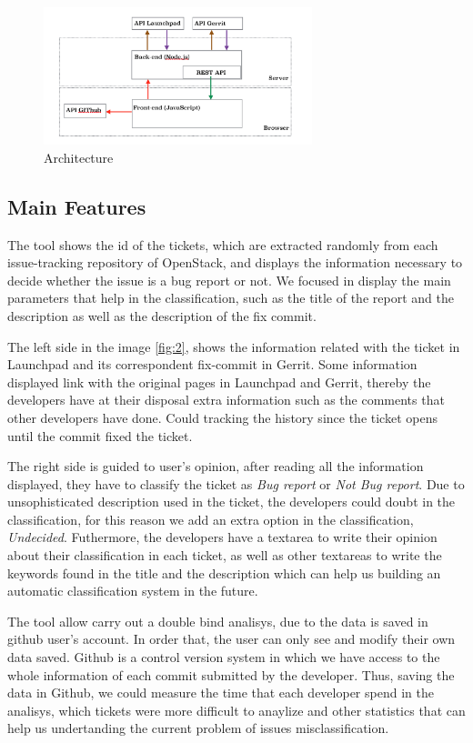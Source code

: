 \documentclass[ifip]{svmult}
\begin{document}
\label{sec:2.1}
\begin{figure}
\centering
\includegraphics[height=4cm]{Arquitectura.png}
\caption{Architecture}
\label{fig:1}       %
\end{figure}

\subsection{Main Features}
\label{sec:2.2}
The tool shows the id of the tickets, which are extracted randomly from each issue-tracking repository of OpenStack, and displays the information necessary to decide whether the issue is a bug report or not. We focused in display the main parameters that help in the classification, such as the title of the report and the description as well as the description of the fix commit. 

The left side in the image \ref{fig:2}, shows the information related with the ticket in Launchpad and its correspondent fix-commit in Gerrit. Some information displayed link with the original pages in Launchpad and Gerrit, thereby the  developers have at their disposal extra information such as the comments that other developers have done. Could tracking the history since the ticket opens until the commit fixed the ticket.

The right side is guided to user's opinion, after reading all the information displayed, they have to classify the ticket as \textit{Bug report} or \textit{Not Bug report}. Due to unsophisticated description used in the ticket, the developers could doubt in the classification, for this reason we add an extra option in the classification, \textit{Undecided}. Futhermore, the developers have a textarea to write their opinion about their classification in each ticket, as well as other textareas to write the keywords found in the title and the description which can help us building an automatic classification system in the future.

The tool allow carry out a double bind analisys, due to the data is saved in github user's account. In order that, the user can only see and modify their own data saved. Github is a control version system in which we have access to the whole information of each commit submitted by the developer. Thus, saving the data in Github, we could measure the time that each developer spend in the analisys, which tickets were more difficult to anaylize and other statistics that can help us undertanding the current problem of issues misclassification.
\end{document}
